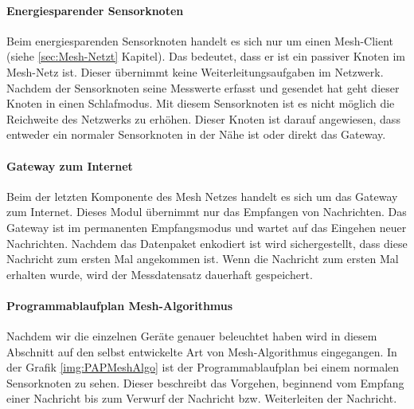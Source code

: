 \paragraph{Energiesparender Sensorknoten} Beim energiesparenden Sensorknoten handelt es sich nur um einen Mesh-Client (siehe \ref{sec:Mesh-Netzt} Kapitel). Das bedeutet, dass er ist ein passiver Knoten im Mesh-Netz ist. Dieser übernimmt keine Weiterleitungsaufgaben im Netzwerk. Nachdem der Sensorknoten seine Messwerte erfasst und gesendet hat geht dieser Knoten in einen Schlafmodus. Mit diesem Sensorknoten ist es nicht möglich die Reichweite des Netzwerks zu erhöhen. Dieser Knoten ist darauf angewiesen, dass entweder ein normaler Sensorknoten in der Nähe ist oder direkt das Gateway.
\paragraph{Gateway zum Internet} Beim der letzten Komponente des Mesh Netzes handelt es sich um das Gateway zum Internet. Dieses Modul übernimmt nur das Empfangen von Nachrichten. Das Gateway ist im permanenten Empfangsmodus und wartet auf das Eingehen neuer Nachrichten. Nachdem das Datenpaket enkodiert ist wird sichergestellt, dass diese Nachricht zum ersten Mal angekommen ist. Wenn die Nachricht zum ersten Mal erhalten wurde, wird der Messdatensatz dauerhaft gespeichert. 
\paragraph{Programmablaufplan Mesh-Algorithmus} Nachdem wir die einzelnen Geräte genauer beleuchtet haben wird in diesem Abschnitt auf den  selbst entwickelte Art von Mesh-Algorithmus eingegangen. In der Grafik \ref{img:PAPMeshAlgo} ist der Programmablaufplan bei einem normalen Sensorknoten zu sehen. Dieser beschreibt das Vorgehen, beginnend vom Empfang einer Nachricht bis zum Verwurf der Nachricht bzw. Weiterleiten der Nachricht. 

